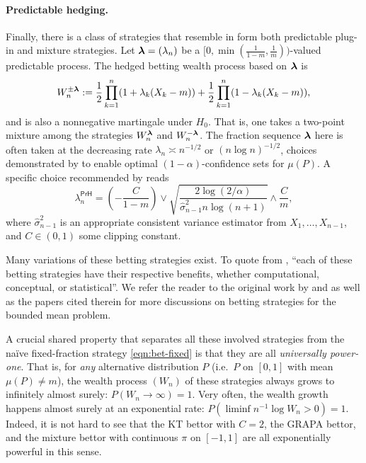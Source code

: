 \paragraph{Predictable hedging.} Finally, there is a class of strategies that resemble in form both predictable plug-in and mixture strategies. Let $\boldsymbol{\lambda} = (\lambda_n)$ be a $[0, \min(\frac{1}{1-m}, \frac{1}{m} ) )$-valued predictable process. The hedged betting wealth process based on $\boldsymbol{\lambda}$ is
\begin{equation}\label{eqn:hedged}
    W_n^{\pm\boldsymbol{\lambda}} := \frac{1}{2} \prod_{k=1}^n (1 + \lambda_k(X_k - m) ) + \frac{1}{2} \prod_{k=1}^n (1 - \lambda_k(X_k - m) ),
\end{equation}
and is also a nonnegative martingale under $H_0$.
That is, one takes a two-point mixture among the strategies $W_n^{\boldsymbol{\lambda}}$ and $W_n^{-\boldsymbol{\lambda}}$. The fraction sequence $\boldsymbol{\lambda}$ here is often taken at the decreasing rate $\lambda_n \asymp n^{-1/2}$ or $(n\log n)^{-1/2}$, choices demonstrated by \cite{waudby2024estimating,shekhar2023near} to enable optimal $(1-\alpha)$-confidence sets for $\mu(P)$. A specific choice recommended by \citet[Equation (26)]{waudby2024estimating} reads
\begin{equation}\label{eqn:hedging-rate}
    \lambda_n^{\mathsf{PrH}} = \left( -\frac{C}{1-m} \right) \vee \sqrt{\frac{2\log(2/\alpha)}{\widehat \sigma_{n-1}^2 n \log(n+1)}}
    \wedge \frac{C}{m},
\end{equation}
where $\widehat \sigma_{n-1}^2$ is an appropriate consistent variance estimator from $X_1,\dots, X_{n-1}$, and $C\in(0,1)$ some clipping constant.

\vspace{1em}

Many variations of these betting strategies exist.
To quote from \cite{waudby2024estimating}, 
``each of these betting strategies have their respective benefits, whether computational, conceptual, or
statistical''. We refer the reader to the original work by \cite{waudby2024estimating} and \cite{orabona2023tight} as well as the papers cited therein for more discussions on betting strategies for the bounded mean problem.

A crucial shared property that separates all these involved strategies from the na\"ive fixed-fraction strategy \eqref{eqn:bet-fixed} is that they are all \emph{universally power-one}. That is, for \emph{any} alternative distribution $P$ (i.e.\ $P$ on $[0,1]$ with mean $\mu(P)\neq m$), the wealth process $(W_n)$ of these strategies always grows to infinitely almost surely: $P(W_n \to \infty)=1$. 
Very often, the wealth growth happens almost surely at an exponential rate: $P(\liminf n^{-1}\log W_n > 0) = 1$. Indeed, it is not hard to see that the KT bettor with $C = 2$, the GRAPA bettor, and the mixture bettor with continuous $\pi$ on $[-1,1]$ are all exponentially powerful in this sense.

